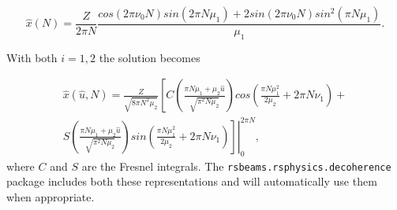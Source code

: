 \documentclass[]{article}
\begin{document}
\begin{equation}
	\hat{x}(N) = \frac{Z}{2 \pi N}\frac{cos(2 \pi \nu_0 N) sin(2 \pi N \mu_1) + 2sin(2\pi \nu_0 
	N) 
	sin^2(\pi N \mu_1)}{\mu_1}.
\end{equation}

With both $i=1,2$ the solution becomes

\begin{multline}
\hat{x}(\hat{u}, N) = \frac{Z}{\sqrt{8 \pi N^2 \mu_2}} \left[
C\left( \frac{\pi N \mu_1 +\mu_2 \hat{u} }{\sqrt{\pi^2 N \mu_2}} \right)
cos \left( \frac{\pi N \mu_1^2}{2 \mu_2} + 2 \pi N \nu_1 \right) \right. + \\
\left. \left. S\left( \frac{\pi N \mu_1 +\mu_2 \hat{u} }{\sqrt{\pi^2 N \mu_2}} \right)
sin \left( \frac{\pi N \mu_1^2}{2 \mu_2} + 2 \pi N \nu_1 \right)
\right] \right|_{0}^{2 \pi N},
\end{multline}
where $C$ and $S$ are the Fresnel integrals. The \texttt{rsbeams.rsphysics.decoherence} 
package includes both these representations and will automatically use them when 
appropriate.
\end{document}
